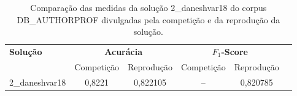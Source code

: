 \begin{table}[!thb]
    \centering
    \caption{Comparação das medidas da solução 2\_daneshvar18 do corpus DB\_AUTHORPROF divulgadas pela competição e da reprodução da solução.}
    \begin{adjustbox}{max width={\textwidth},keepaspectratio}%
    \begin{tabular}{|l|c|c|c|c|c|}
        \hline
        \multirow{2}{*}{\textbf{Solução}}
        & \multicolumn{2}{|c|}{\textbf{Acurácia}}
        & \multicolumn{2}{|c|}{\textbf{$F_1$-Score}}
        \\ \cline{2-5}    
        & Competição    & Reprodução
        & Competição    & Reprodução 
        \\ \hline
        2\_daneshvar18        
        & 0,8221        & 0,822105	
        & --            & 0,820785
        \\ 
        \hline
    \end{tabular}
    \end{adjustbox}
    \label{tab:reprodução-db-authorprof} 
\end{table}
